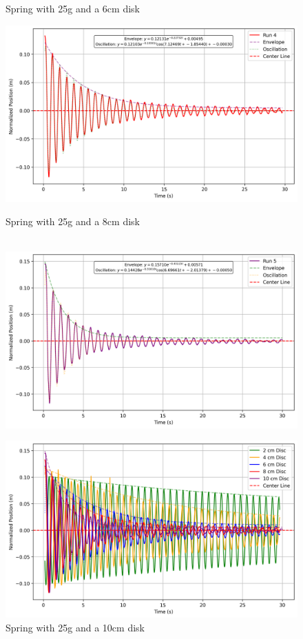 \documentclass[12pt,letterpaper]{article}
\begin{document}
\begin{figure}[]
  \caption{Spring with 25g and a 6cm disk}\label{fig:6cm}
\endminipage\hfill
{}
  \includegraphics[width=\linewidth]{images/8cm.png}
  \caption{Spring with 25g and a 8cm disk}\label{fig:8cm}
\endminipage\hfill
\\
  \includegraphics[width=\linewidth]{images/10cm.png}
  \caption{Spring with 25g and a 10cm disk}\label{fig:10cm}
\endminipage\hfill
{}
  \includegraphics[width=\linewidth]{images/all.png}

\end{figure}
\end{document}
